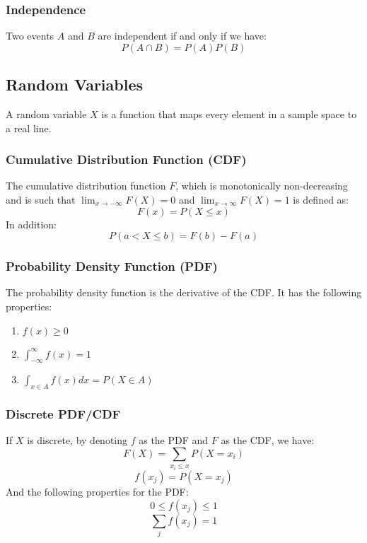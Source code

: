 \documentclass[twoside,twocolumn]{article}
\begin{document}
\subsubsection{Independence}
Two events $A$ and $B$ are independent if and only if we have:
\begin{equation} P(A \cap B) = P(A) P(B) \end{equation}
\subsection{Random Variables}
A random variable $X$ is a function that maps every element in a sample space
to a real line.
\subsubsection{Cumulative Distribution Function (CDF)}
The cumulative distribution function $F$, which is monotonically non-decreasing
and is such that $\lim_{x \to -\infty}F(X) = 0$ and $\lim_{x \to \infty}F(X) = 1$
is defined as:
\begin{equation} F(x) = P(X \leq x) \end{equation}
In addition:
\begin{equation} P(a < X \leq b) = F(b) - F(a) \end{equation}
\subsubsection{Probability Density Function (PDF)}
The probability density function is the derivative of the CDF.
It has the following properties:
\begin{enumerate}
  \item $f(x) \geq 0$
  \item $\int^{\infty}_{-\infty} f(x) = 1$
  \item $\int_{x \in A} f(x) dx = P(X \in A)$
\end{enumerate}
\subsubsection{Discrete PDF/CDF}
If $X$ is discrete, by denoting $f$ as the PDF and $F$ as the CDF, we have:
\begin{equation}
  F(X) = \sum_{x_i \leq x} P(X = x_i)
\end{equation}
\begin{equation}
  f(x_j) = P(X = x_j)
\end{equation}
And the following properties for the PDF:
\begin{equation}
  0 \leq f(x_j) \leq 1
\end{equation}
\begin{equation}
  \sum_j f(x_j) = 1
\end{equation}
\end{document}
